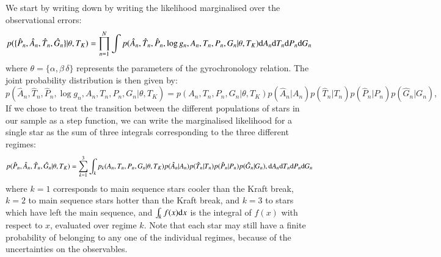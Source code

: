 \documentclass[11pt,a4paper]{article}
\begin{document}
We start by writing down by writing the likelihood marginalised over
the observational errors:
\begin{equation}
\label{eq:fullL}
  p(\{\hat{P}_n,\hat{A}_n,\hat{T}_n,\hat{G}_n\}|\theta,T_K) = 
  \prod_{n=1}^{N} \int p(\hat{A}_n,\hat{T}_n,\hat{P}_n,\log {g}_n,A_n,T_n,P_n,G_n|\theta,T_K) 
  {\rm d}A_n {\rm d}T_n {\rm d}P_n {\rm d}G_n
\end{equation}
where $\theta = \{\alpha,\beta\,\delta\}$ represents the parameters of
the gyrochronology relation.  The joint probability distribution is
then given by:
\begin{equation}
  \label{eq:jointprob}
  p(\hat{A}_n,\hat{T}_n,\hat{P}_n,\log {g}_n,A_n,T_n,P_n,G_n|\theta,T_K) = 
  p(A_n,T_n,P_n,G_n|\theta,T_K) p(\hat{A}_n|A_n) 
  p(\hat{T}_n|T_n) p(\hat{P}_n|P_n) p(\hat{G}_n|G_n),
\end{equation}
If we chose to treat the transition between the different populations
of stars in our sample as a step function, we can write the
marginalised likelihood for a single star as the sum of three
integrals corresponding to the three different regimes:
\begin{equation}
  \label{eq:L1}
  p(\hat{P}_n,\hat{A}_n,\hat{T}_n,\hat{G}_n|\theta,T_K)  = 
  \sum_{k=1}^3 \int_k p_k(A_n,T_n,P_n,G_n|\theta,T_K) 
  p(\hat{A}_n|A_n) p(\hat{T}_n|T_n) p(\hat{P}_n|P_n) p(\hat{G}_n|G_n),
  {\rm d}A_n {\rm d}T_n {\rm d}P_n {\rm d}G_n
\end{equation}
where $k=1$ corresponds to main sequence stars cooler than the Kraft
break, $k=2$ to main sequence stars hotter than the Kraft break, and
$k=3$ to stars which have left the main sequence, and $\int_k f(x)
{\rm d}x$ is the integral of $f(x)$ with respect to $x$, evaluated
over regime $k$. Note that each star may still have a finite
probability of belonging to any one of the individual regimes, because
of the uncertainties on the observables.
\end{document}
